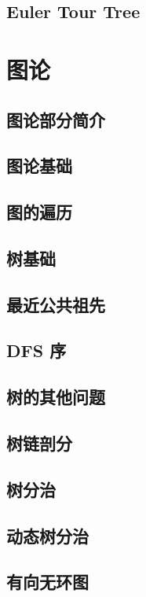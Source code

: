 \section{Euler Tour Tree}

\chapter{图论}
\section{图论部分简介}

\section{图论基础}

\section{图的遍历}

  \section{树基础}
  
  \section{最近公共祖先}
  
  \section{DFS 序}
  
  \section{树的其他问题}
  
  \section{树链剖分}
  
  \section{树分治}
  
  \section{动态树分治}
  
\section{有向无环图}

